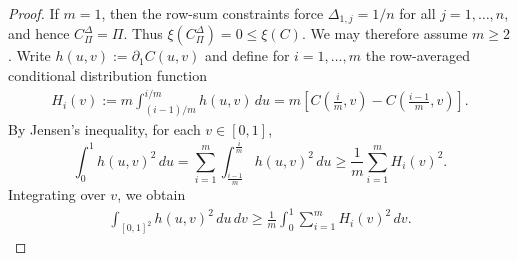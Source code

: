 \documentclass{article}
\theoremstyle{definition}
\begin{document}
\begin{proof}
    If \(m=1\), then the row-sum constraints force \(\Delta_{1,j}=1/n\) for all \(j=1,\ldots,n\), and hence \(C_\Pi^\Delta=\Pi\).
    Thus \(\xi(C_\Pi^\Delta)=0\le \xi(C)\).
    We may therefore assume \(m\ge2\).
    Write
    \(
        h(u,v):=\partial_1 C(u,v)
    \)
    and define for \(i=1,\dots,m\) the row-averaged conditional distribution function
    \begin{align}\label{eq:H_i}
        H_i(v)
        :=
        m\int_{(i-1)/m}^{i/m} h(u,v)\,du
        =
        m\left[
            C\left(\frac{i}{m},v\right)
            -
            C\left(\frac{i-1}{m},v\right)
        \right].
    \end{align}
    By Jensen's inequality, for each \(v\in[0,1]\),
    \[
        \int_0^1 h(u,v)^2\,du
        =
        \sum_{i=1}^m
        \int_{\frac{i-1}m}^{\frac{i}m} h(u,v)^2\,du
        \ge
        \frac1m\sum_{i=1}^m H_i(v)^2.
    \]
    Integrating over \(v\), we obtain
    \begin{align}\label{eq:strip_average_inequality}
        \int_{[0,1]^2} h(u,v)^2\,du\,dv
        \ge
        \frac1m\int_0^1\sum_{i=1}^m H_i(v)^2\,dv.
    \end{align}


\end{proof}
\end{document}
